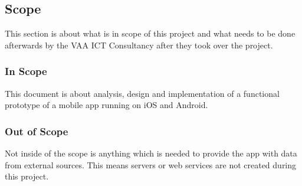 \subsection{Scope}
This section is about what is in scope of this project and what needs to be done afterwards by the VAA ICT Consultancy after they took over the project.
\subsubsection{In Scope}
This document is about analysis, design and implementation of a functional prototype of a mobile \gls{app} running on iOS and Android. 
\subsubsection{Out of Scope}
Not inside of the scope is anything which is needed to provide the \gls{app} with data from external sources. This means servers or web services are not created during this project. 